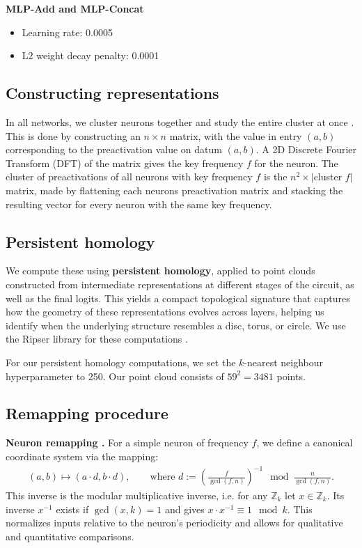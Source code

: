 \documentclass{article} %
\theoremstyle{plain}
\theoremstyle{definition}
\newtheorem{empirical fact}[theorem]{Empirical Fact}
\begin{document}
\textbf{MLP-Add and MLP-Concat}
\begin{itemize}
    \item Learning rate: 0.0005
    \item L2 weight decay penalty: 0.0001
\end{itemize}

\subsection{Constructing representations}

In all networks, we cluster neurons together and study the entire cluster at once \cite{mccracken2025uncoveringuniversalabstractalgorithm}. This is done by constructing an $n\times n$ matrix, with the value in entry $(a, b)$ corresponding to the preactivation value on datum $(a,b)$.
A 2D Discrete Fourier Transform (DFT) of the matrix gives the key frequency $f$ for the neuron.
The cluster of preactivations of all neurons with key frequency $f$ is the $n^2 \times |$cluster $f|$ matrix, made by flattening each neurons preactivation matrix and stacking the resulting vector for every neuron with the same key frequency.

\subsection{Persistent homology}\label{app:persistent-homology}

We compute these using \textbf{persistent homology}, applied to point clouds constructed from intermediate representations at different stages of the circuit, as well as the final logits. This yields a compact topological signature that captures how the geometry of these representations evolves across layers, helping us identify when the underlying structure resembles a disc, torus, or circle. We use the Ripser library for these computations \cite{Bauer2021Ripser, de_Silva_2011, ctralie2018ripser}.

For our persistent homology computations, we set the $k$-nearest neighbour hyperparameter to 250. Our point cloud consists of $59^2=3481$ points.

\subsection{Remapping procedure}\label{app:remapping}

\textbf{Neuron remapping \citep{mccracken2025uncoveringuniversalabstractalgorithm}.} For a simple neuron of frequency $f$, we define a canonical coordinate system via the mapping:
\begin{align}
    (a,b)\mapsto (a\cdot d,b\cdot d),  \quad\quad \text{where }
    d:= \left(\frac{f}{\gcd(f,n)}\right)^{-1} \mod \frac{n}{\gcd(f,n)} .\label{eq:remapping}
\end{align}
This inverse is the modular multiplicative inverse, i.e. for any $\mathbb{Z}_k$ let $x\in \mathbb{Z}_k$. Its inverse $x^{-1}$ exists if $\gcd(x,k)=1$ and gives $x\cdot x^{-1}\equiv 1 \mod k$. This normalizes inputs relative to the neuron's periodicity and allows for qualitative and quantitative comparisons. 
\end{document}
